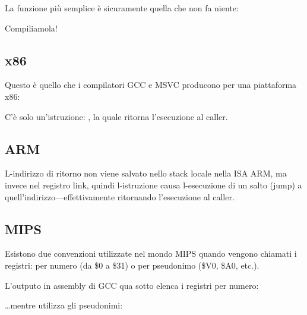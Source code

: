 \label{empty_func}

La funzione più semplice è sicuramente quella che non fa niente:



Compiliamola!

\subsection{x86}

Questo è quello che i compilatori GCC e MSVC producono per una piattaforma x86:



C'è solo un'istruzione: \RET, la quale ritorna l'esecuzione al \gls{caller}.

\subsection{ARM}



L-indirizzo di ritorno non viene salvato nello stack locale nella \ac{ISA} ARM, ma invece nel registro link,
quindi l-istruzione  causa l-esecuzione di un salto (jump) a quell'indirizzo---effettivamente ritornando l'esecuzione
al \gls{caller}.

\subsection{MIPS}

Esistono due convenzioni utilizzate nel mondo MIPS quando vengono chiamati i registri:
per numero (da \$0 a \$31) o per pseudonimo (\$V0, \$A0, etc.).

L'outputo in assembly di GCC qua sotto elenca i registri per numero:



\dots mentre \IDA utilizza gli pseudonimi:



